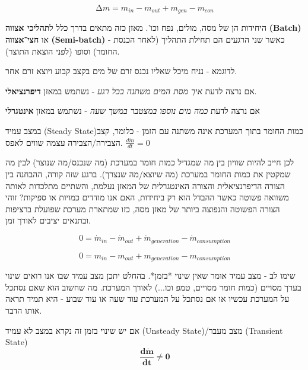\documentclass[
  hebrew,
  letterpaper,
  DIV=11,
  numbers=noendperiod]{scrreprt}
\begin{document}
\[\mathrm{\Delta}m = m_{in} - m_{out} + m_{gen} - m_{con}\]

היחידות הן של מסה, מולים, נפח וכו'. מאזן כזה מתאים בדרך כלל
ל\textbf{תהליכי אצווה} \textbf{(Batch)} או \textbf{חצי־אצווה}
\textbf{(Semi-batch)} - כאשר שני הרגעים הם תחילת התהליך (לאחר הכנסת
החומר) וסופו (לפני הוצאת התוצר).

לדוגמא - נניח מיכל שאליו נכנס זרם של מים בקצב קבוע ויוצא זרם אחר.

אם נרצה לדעת \emph{איך מסת המים משתנה בכל רגע} - נשתמש במאזן
\textbf{דיפרנציאלי}.

אם נרצה לדעת \emph{כמה מים נוספו במצטבר במשך שעה} - נשתמש במאזן
\textbf{אינטגרלי}

במצב עמיד (Steady State)כמות החומר בתוך המערכת אינה משתנה עם הזמן -
כלומר, קצב הצבירה/הצבירה עצמה שווים לאפס. \(\frac{d\dot{m}}{dt} = 0\)

לכן חייב להיות שוויון בין מה שמגדיל כמות חומר במערכת (מה שנכנס/מה שנוצר)
לבין מה שמקטין את כמות החומר במערכת (מה שיוצא/מה שנצרך). ברגע שזה קורה,
ההבחנה בין הצורה הדיפרנציאלית והצורה האינטגרלית של המאזן נעלמת, והשתיים
מתלכדות לאותה משוואה פשוטה כאשר ההבדל הוא רק ביחידות, האם אנו מודדים
כמויות או ספיקות? זוהי הצורה הפשוטה והנפוצה ביותר של מאזן מסה, כזו
שמתארת מערכת שפועלת ברציפות ובתנאים יציבים לאורך זמן.

\[0 = {\dot{m}}_{in} - {\dot{m}}_{out} + {\dot{m}}_{generation} - {\dot{m}}_{consumption}\]

\[0 = m_{in} - m_{out} + m_{generation} - m_{consumption}\]

\begin{tcolorbox}[enhanced jigsaw, colback=white, arc=.35mm, coltitle=black, breakable, toptitle=1mm, leftrule=.75mm, colbacktitle=quarto-callout-tip-color!10!white, opacitybacktitle=0.6, bottomtitle=1mm, titlerule=0mm, opacityback=0, colframe=quarto-callout-tip-color-frame, title=\textcolor{quarto-callout-tip-color}{\faLightbulb}\hspace{0.5em}{עצה}, rightrule=.15mm, bottomrule=.15mm, toprule=.15mm, left=2mm]

שימו לב - מצב עמיד אומר שאין שינוי *בזמן*. בהחלט יתכן מצב עמיד שבו אנו
רואים שינוי בערך מסויים (כמות חומר מסויים, טמפ\textquotesingle{} וכו...)
לאורך המערכת. מה שחשוב הוא שאם נסתכל על המערכת עכשיו או אם נסתכל על
המערכת עוד שעה או עוד שבוע - היא תמיד תראה אותו הדבר.

\end{tcolorbox}

אם יש שינוי בזמן זה נקרא במצב לא עמיד (Unsteady State)/מצב מעבר
(Transient State)
\[\frac{\mathbf{d}\dot{\mathbf{m}}}{\mathbf{dt}} \neq \mathbf{0}\]
\end{document}
